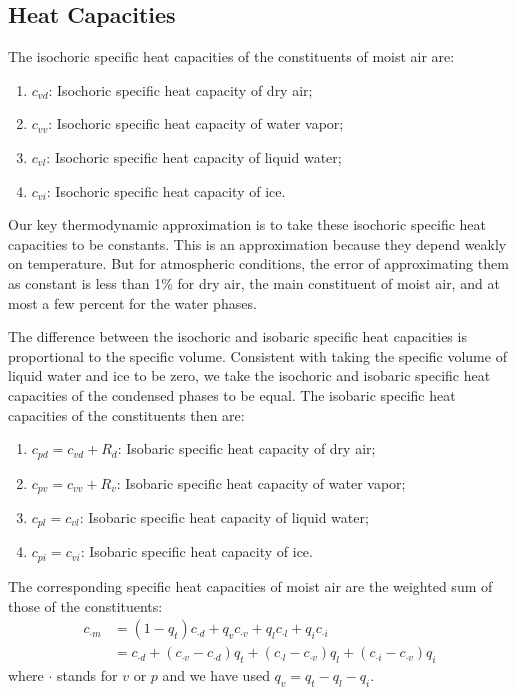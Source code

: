 \documentclass{article}
\begin{document}
\subsection{Heat Capacities}\label{s:heat_capacities}

The isochoric specific heat capacities of the constituents of moist air are:
\begin{enumerate}
    \item $c_{vd}$: Isochoric specific heat capacity of dry air;
    \item $c_{vv}$: Isochoric specific heat capacity of water vapor;
    \item $c_{vl}$: Isochoric specific heat capacity of liquid water;
    \item $c_{vi}$: Isochoric specific heat capacity of ice.
\end{enumerate}
Our key thermodynamic approximation is to take these isochoric specific heat capacities to be constants. This is an approximation because they depend weakly on temperature. But for atmospheric conditions, the error of approximating them as constant is less than 1\% for dry air, the main constituent of moist air, and at most a few percent for the water phases.

The difference between the isochoric and isobaric specific heat capacities is proportional to the specific volume. Consistent with taking the specific volume of liquid water and ice to be zero, we take the isochoric and isobaric specific heat capacities of the condensed phases to be equal. The isobaric specific heat capacities of the constituents then are:
\begin{enumerate}
    \item $c_{pd} = c_{vd} + R_d$: Isobaric specific heat capacity of dry air;
    \item $c_{pv} = c_{vv} + R_v$: Isobaric specific heat capacity of water vapor;
    \item $c_{pl} = c_{vl}$: Isobaric specific heat capacity of liquid water;
    \item $c_{pi} = c_{vi}$: Isobaric specific heat capacity of ice.
\end{enumerate}

The corresponding specific heat capacities of moist air are the weighted sum of those of the constituents:
\begin{align}
    c_{\cdot m} & = (1-q_t) c_{\cdot d} + q_v c_{\cdot v} + q_l c_{\cdot l} + q_i c_{\cdot i}\\
    & = c_{\cdot d} + (c_{\cdot v} - c_{\cdot d})q_t + (c_{\cdot l} - c_{\cdot v})q_l + (c_{\cdot i} - c_{\cdot v})q_i
\end{align}
where $\cdot$ stands for $v$ or $p$ and we have used $q_v = q_t -q_l - q_i$.
\end{document}
